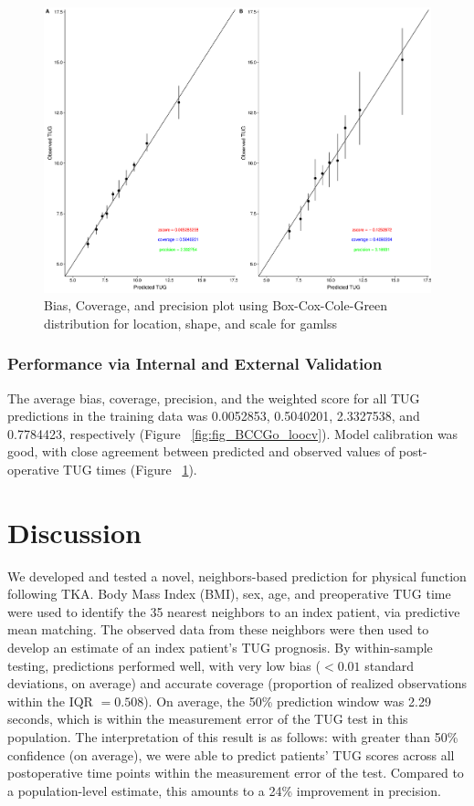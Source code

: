 \documentclass[fleqn,10pt]{wlscirep}\usepackage{knitr}
\begin{document}
\begin{figure}[!htbp]
\centering
\includegraphics[width=\linewidth]{fig_BCCGo_cal}
\caption{Bias, Coverage, and precision plot using Box-Cox-Cole-Green distribution for location, shape, and scale for gamlss}
\label{fig:fig_BCCGop_cal}
\end{figure}

\subsubsection*{Performance via Internal and External Validation}

The average bias, coverage, precision, and the weighted score for all TUG predictions in the training data was 0.0052853, 0.5040201, 2.3327538, and 0.7784423, respectively (Figure ~\ref{fig:fig_BCCGo_loocv}). Model calibration was good, with close agreement between predicted and observed values of post-operative TUG times (Figure ~\ref{fig:fig_BCCGop_cal}). 


\section*{Discussion}

We developed and tested a novel, neighbors-based prediction for physical function following TKA. Body Mass Index (BMI), sex, age, and preoperative TUG time were used to identify the 35 nearest neighbors to an index patient, via predictive mean matching.  The observed data from these neighbors were then used to develop an estimate of an index patient’s TUG prognosis. By within-sample testing, predictions performed well, with very low bias ($<0.01$ standard deviations, on average) and accurate coverage (proportion of realized observations within the IQR $= 0.508$). On average, the 50\% prediction window was 2.29 seconds, which is within the measurement error of the TUG test in this population. The interpretation of this result is as follows: with greater than 50\% confidence (on average), we were able to predict patients’ TUG scores across all postoperative time points within the measurement error of the test. Compared to a population-level estimate, this amounts to a 24\% improvement in precision. 
\end{document}
